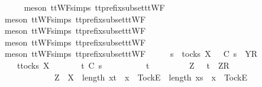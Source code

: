 \ \ \ \ \isamarkupfalse%
\ {\isacharparenleft}meson\ ttWF{\isachardot}simps{\isacharparenleft}{}{}{\isacharparenright}\ tt{\isacharunderscore}prefix{\isacharunderscore}subset{\isacharunderscore}ttWF{\isacharparenright}\isanewline
\ \ \ \ \isamarkupfalse%
\ {\isacharparenleft}meson\ ttWF{\isachardot}simps{\isacharparenleft}{}{}{\isacharparenright}\ tt{\isacharunderscore}prefix{\isacharunderscore}subset{\isacharunderscore}ttWF{\isacharparenright}\isanewline
\ \ \ \ \isamarkupfalse%
\ {\isacharparenleft}meson\ ttWF{\isachardot}simps{\isacharparenleft}{}{}{\isacharparenright}\ tt{\isacharunderscore}prefix{\isacharunderscore}subset{\isacharunderscore}ttWF{\isacharparenright}\isanewline
\ \ \ \ \isamarkupfalse%
\ {\isacharparenleft}meson\ ttWF{\isachardot}simps{\isacharparenleft}{}{\isacharparenright}\ tt{\isacharunderscore}prefix{\isacharunderscore}subset{\isacharunderscore}ttWF{\isacharparenright}\isanewline
\ \ \ \ \isamarkupfalse%
\ {\isacharparenleft}meson\ ttWF{\isachardot}simps{\isacharparenleft}{}{\isacharparenright}\ tt{\isacharunderscore}prefix{\isacharunderscore}subset{\isacharunderscore}ttWF{\isacharparenright}\isanewline
\ \ \isamarkupfalse%
\ \isamarkupfalse%
\ {\isachardoublequoteopen}s\ {\isasymin}\ tocks\ X\ {\isasymLongrightarrow}\ {\isasymrho}\ {\isasymlesssim}\isactrlsub C\ s\ {\isacharat}\ {\isacharbrackleft}{\isacharbrackleft}Y{\isacharbrackright}\isactrlsub R{\isacharbrackright}\ {\isasymLongrightarrow}\isanewline
\ \ \ \ {\isasymexists}t{\isasymin}tocks\ X{\isachardot}\isanewline
\ \ \ \ \ \ \ t\ {\isasymlesssim}\isactrlsub C\ s\ {\isasymand}\isanewline
\ \ \ \ \ \ \ {\isacharparenleft}{\isasymrho}\ {\isacharequal}\ t\ {\isasymor}\isanewline
\ \ \ \ \ \ \ \ {\isacharparenleft}{\isasymexists}Z{\isachardot}\ {\isasymrho}\ {\isacharequal}\ t\ {\isacharat}\ {\isacharbrackleft}{\isacharbrackleft}Z{\isacharbrackright}\isactrlsub R{\isacharbrackright}\ {\isasymand}\isanewline
\ \ \ \ \ \ \ \ \ \ \ \ \ {\isacharparenleft}Z\ {\isasymsubseteq}\ X\ {\isasymand}\ length\ {\isacharbrackleft}x{\isasymleftarrow}t\ {\isachardot}\ x\ {\isacharequal}\ {\isacharbrackleft}Tock{\isacharbrackright}\isactrlsub E{\isacharbrackright}\ {\isacharless}\ length\ {\isacharbrackleft}x{\isasymleftarrow}s\ {\isachardot}\ x\ {\isacharequal}\ {\isacharbrackleft}Tock{\isacharbrackright}\isactrlsub E{\isacharbrackright}\ {\isasymor}\ \ \ \ \ \ \ \ \isanewline
